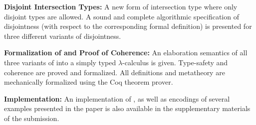 \begin{itemize*}

\item \textbf{Disjoint Intersection Types:} A new form of intersection type
where only disjoint types are allowed. A sound and complete algorithmic
specification of disjointness (with respect to the corresponding formal
definition) is presented for three different variants of disjointness.


\item \textbf{Formalization of \name and Proof of Coherence:} An
   elaboration semantics of all three variants of \name into a simply typed $\lambda$-calculus is
   given. Type-safety and coherence are proved and formalized. All
   definitions and metatheory are mechanically formalized using the Coq theorem prover.

\item \textbf{Implementation:} An implementation of \name, as
well as encodings of several examples presented in the paper is also
available in the supplementary materials of the submission.

\end{itemize*}

